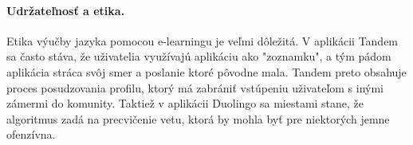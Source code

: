 \documentclass[10pt,oneside,slovak,a4paper]{article}
\begin{document}
\paragraph{Udržateľnosť a etika.}
Etika výučby jazyka pomocou e-learningu je veľmi dôležitá. V aplikácii Tandem sa často stáva, že uživatelia využívajú aplikáciu ako "zoznamku", a tým pádom aplikácia stráca svôj smer a poslanie ktoré pôvodne mala. Tandem preto obsahuje proces posudzovania profilu, ktorý má zabrániť vstúpeniu uživateľom s inými zámermi do komunity. Taktiež v aplikácii Duolingo sa miestami stane, že algoritmus zadá na precvičenie vetu, ktorá by mohla byť pre niektorých jemne ofenzívna. 



\end{document}
